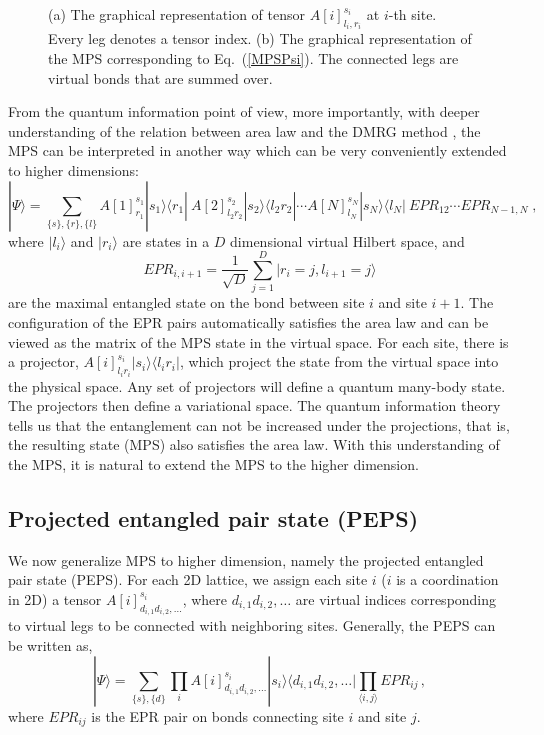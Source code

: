 \documentclass[preprint,3p,times,preprint,showpacs,amsmath,superscriptaddress,floatfix]{elsarticle}
\begin{document}
\begin{figure} [!hbp]
	\begin{center}
		\caption{(a) The graphical representation of tensor $A[i]^{s_i}_{l_{i},r_i}$ at $i$-th site. Every leg denotes a tensor index.
(b) The graphical representation of the MPS corresponding to Eq.~(\ref{MPSPsi}).
The connected legs are virtual bonds that are summed over.}\label{graphicalMPS}
	\end{center}
\end{figure}

From the quantum information point of view, more importantly, with deeper understanding of the relation between area law and the DMRG method \cite{Schollw}, the MPS can be interpreted in another way which can be very conveniently extended to higher dimensions:
%
\begin{equation}\label{MPSPsi3}
|\Psi\rangle=\sum_{\{s\},\{r\},\{l\}}A[1]^{s_1}_{r_1}|s_1\rangle\langle r_1|\  A[2]^{s_2}_{l_2r_2}|s_2\rangle\langle l_2r_2|\cdots A[N]^{s_N}_{l_N}|s_N\rangle\langle l_N|\ EPR_{12}\cdots EPR_{N-1,N} \; ,
\end{equation}
where $|l_i\rangle$ and $|r_i\rangle$ are states in a $D$ dimensional virtual Hilbert space, and
\begin{equation}
EPR_{i,i+1}=\frac 1{\sqrt D}\sum_{j=1}^D |r_i=j,l_{i+1}=j\rangle
\end{equation}
are the maximal entangled state on the bond between site $i$ and site $i+1$. The configuration of the EPR pairs automatically satisfies the area law and can be viewed as the matrix of the MPS state in the virtual space.
 For each site, there is a projector, $A[i]^{s_i}_{l_ir_i}|s_i\rangle\langle l_ir_i|$, which project the state from the virtual space into the physical space. Any set of projectors will define a quantum many-body state. The projectors then define a variational space. The quantum information theory \cite{Bennett}
tells us that the entanglement can not be increased under the projections, that is, the resulting state (MPS) also satisfies the area law. With this understanding of the MPS, it is natural to extend the MPS to the higher dimension.

\subsection{Projected entangled pair state (PEPS)}

We now generalize MPS to higher dimension, namely the projected entangled pair state (PEPS). For each 2D lattice, we assign each site $i$ ($i$ is a coordination in 2D) a tensor $A[i]^{s_i}_{d_{i,1} d_{i,2},\dots}$, where $d_{i,1} d_{i,2},\dots$ are virtual indices corresponding to virtual legs to be connected with neighboring sites. Generally, the PEPS can be written as,
%
\begin{equation}\label{MPSPsi4}
|\Psi\rangle=\sum_{\{s\},\{d\}}\prod_iA[i]^{s_i}_{d_{i,1} d_{i,2},\dots}
|s_i\rangle\langle d_{i,1} d_{i,2},\dots|\prod_{\langle i,j\rangle} EPR_{ij}\, ,
\end{equation}
%
where $EPR_{ij}$ is the EPR pair on bonds connecting site $i$ and site $j$.
\end{document}

